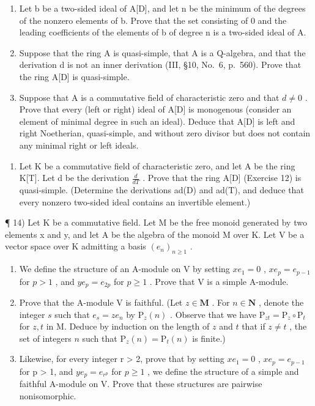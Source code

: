 \begin{enumerate}
\def\labelenumi{\alph{enumi})}
\item
  Let b be a two-sided ideal of A{[}D{]}, and let n be the minimum of the degrees of the nonzero elements of b. Prove that the set consisting of 0 and the leading coefficients of the elements of b of degree n is a two-sided ideal of A.
\item
  Suppose that the ring A is quasi-simple, that A is a Q-algebra, and that the derivation d is not an inner derivation (III, §10, No.~6, p.~560). Prove that the ring A{[}D{]} is quasi-simple.
\item
  Suppose that A is a commutative field of characteristic zero and that \(d \neq 0\) . Prove that every (left or right) ideal of A{[}D{]} is monogenous (consider an element of minimal degree in such an ideal). Deduce that A{[}D{]} is left and right Noetherian, quasi-simple, and without zero divisor but does not contain any minimal right or left ideals.
\end{enumerate}

\begin{enumerate}
\def\labelenumi{\arabic{enumi})}
\setcounter{enumi}{12}
\tightlist
\item
  Let K be a commutative field of characteristic zero, and let A be the ring K{[}T{]}. Let d be the derivation \(\frac{d}{dT}\) . Prove that the ring A{[}D{]} (Exercise 12) is quasi-simple. (Determine the derivations ad(D) and ad(T), and deduce that every nonzero two-sided ideal contains an invertible element.)
\end{enumerate}

¶ 14) Let K be a commutative field. Let M be the free monoid generated by two elements x and y, and let A be the algebra of the monoid M over K. Let V be a vector space over K admitting a basis \((e_{n})_{n\geqslant1}\) .

\begin{enumerate}
\def\labelenumi{\alph{enumi})}
\item
  We define the structure of an A-module on V by setting \(xe_1 = 0\) , \(xe_p = e_{p-1}\) for \(p > 1\) , and \(ye_p = e_{2p}\) for \(p \geqslant 1\) . Prove that V is a simple A-module.
\item
  Prove that the A-module V is faithful. (Let \(z \in \mathbf{M}\) . For \(n \in \mathbf{N}\) , denote the integer \(s\) such that \(e_s = ze_n\) by \(\mathrm{P}_z(n)\) . Observe that we have \(\mathrm{P}_{zt} = \mathrm{P}_z \circ \mathrm{P}_t\) for \(z, t\) in M. Deduce by induction on the length of \(z\) and \(t\) that if \(z \neq t\) , the set of integers \(n\) such that \(\mathrm{P}_z(n) = \mathrm{P}_t(n)\) is finite.)
\item
  Likewise, for every integer r \textgreater{} 2, prove that by setting \(xe_{1} = 0\) , \(xe_{p} = e_{p-1}\) for p \textgreater{} 1, and \(ye_{p} = e_{r^{p}}\) for \(p \geqslant 1\) , we define the structure of a simple and faithful A-module on V. Prove that these structures are pairwise nonisomorphic.
\end{enumerate}

